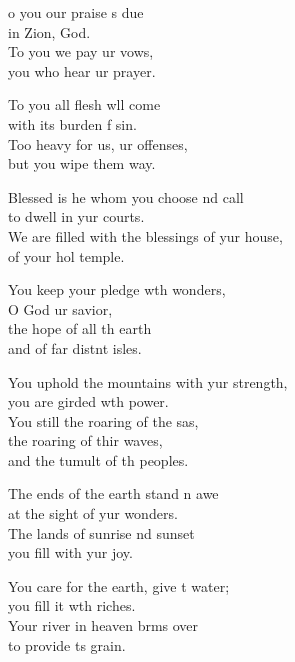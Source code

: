 \settowidth{\versewidth}{We are filled with the blessings of your house, *}
\begin{psalmverse}%
  \begin{patverse}
    o you our praise \pointup{\i}s due\Med\\
in Zion,  God.\\
To you we pay ur vows,\Med\\
you who hear ur prayer.

To you all flesh w\pointup{\i}ll come\Med\\
with its burden f sin.\\
Too heavy for us, ur offenses,\Med\\
but you wipe them way.

Blessed is he whom you choose nd call\Med\\
to dwell in yur courts.\\
We are filled with the blessings of yur house,\Med\\
of your hol temple.

You keep your pledge w\pointup{\i}th wonders,\Med\\
O God ur savior,\\
the hope of all th earth\Med\\
and of far distnt isles.

You uphold the mountains with yur strength,\Med\\
you are girded w\pointup{\i}th power.\\
You still the roaring of the sas,\Flex\\
the roaring of thir waves,\Med\\
and the tumult of th peoples.

The ends of the earth stand \pointup{\i}n awe\Med\\
at the sight of yur wonders.\\
The lands of sunrise nd sunset\Med\\
you fill with yur joy.

You care for the earth, give \pointup{\i}t water;\Med\\
you fill it w\pointup{\i}th riches.\\
Your river in heaven br\pointup{\i}ms over\Med\\
to provide \pointup{\i}ts grain.


\end{patverse}
\end{psalmverse}
